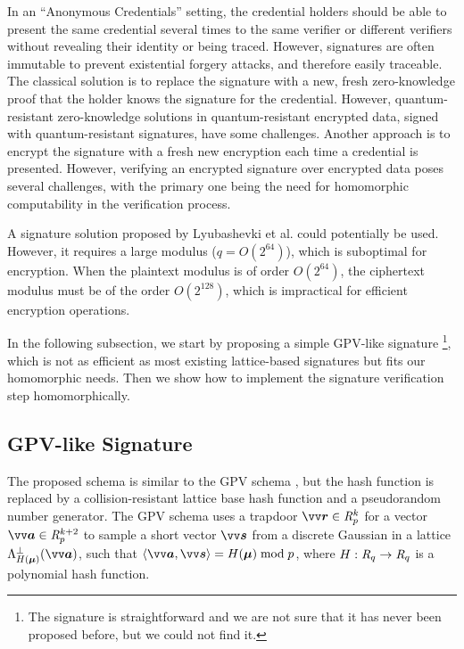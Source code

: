 In an ``Anonymous Credentials'' setting, the credential holders should be able to present the same credential several times to the same verifier or different verifiers without revealing their identity or being traced. However, signatures are often immutable to prevent existential forgery attacks, and therefore easily traceable. The classical solution is to replace the signature with a new, fresh zero-knowledge proof that the holder knows the signature for the credential. However, quantum-resistant zero-knowledge solutions in quantum-resistant encrypted data, signed with quantum-resistant signatures, have some challenges\cite{bootleFrameworkPracticalAnonymous2023}. Another approach is to encrypt the signature with a fresh new encryption each time a credential is presented. However, verifying an encrypted signature over encrypted data poses several challenges, with the primary one being the need for homomorphic computability in the verification process.

A signature solution proposed by Lyubashevki et al.\cite{lyubashevskyShorterLatticeBasedGroup2021} could potentially be used. However, it requires a large modulus ($q = O(2^{64})$), which is suboptimal for encryption. When the plaintext modulus is of order $O(2^{64})$, the ciphertext modulus must be of the order $O(2^{128})$, which is impractical for efficient encryption operations.

In the following subsection, we start by proposing a simple GPV-like signature
\footnote{The signature is straightforward and we are not sure that it has never been proposed before, but we could not find it.},
which is not as efficient as most existing lattice-based signatures but fits our homomorphic needs.
Then we show how to implement the signature verification step homomorphically.

\subsection{GPV-like Signature}
The proposed schema is similar to the GPV schema \cite{gentryTrapdoorsHardLattices2008}, but the hash function is replaced by a collision-resistant lattice base hash function and a pseudorandom number generator. The GPV schema uses a trapdoor $\pv{r} \in \intring_p^k$ for a vector $\pv{a} \in \intring_p^{k+2}$
to sample a short vector $\pv{s}$ from a discrete Gaussian in a lattice $\Lambda^{\perp}_{H(\boldsymbol{\mu})}(\pv{a})$,
such that $\inprod{\pv{a}}{\pv{s}}=H(\boldsymbol{\mu}) \bmod p$, where $H:\mathit{R}_q \to \mathit{R}_q$ is a polynomial hash function.

